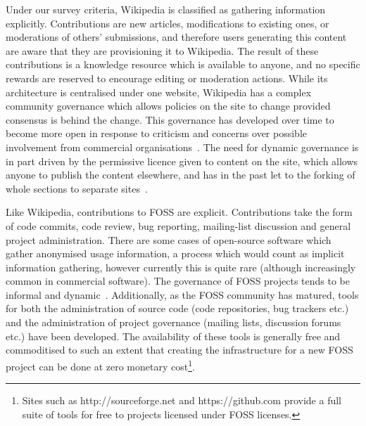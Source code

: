 Under our survey criteria, Wikipedia is classified as gathering information explicitly. Contributions are new articles, modifications to existing ones, or moderations of others' submissions, and therefore users generating this content are aware that they are provisioning it to Wikipedia. The result of these contributions is a knowledge resource which is available to anyone, and no specific rewards are reserved to encourage editing or moderation actions. While its architecture is centralised under one website, Wikipedia has a complex community governance which allows policies on the site to change provided consensus is behind the change. This governance has developed over time to become more open in response to criticism and concerns over possible involvement from commercial organisations~\citep{MayoFusterMorell2011}. The need for dynamic governance is in part driven by the permissive licence given to content on the site, which allows anyone to publish the content elsewhere, and has in the past let to the forking of whole sections to separate sites~\citep{Famiglietti2011}.

Like Wikipedia, contributions to \ac{FOSS} are explicit. Contributions take the form of code commits, code review, bug reporting, mailing-list discussion and general project administration. 
There are some cases of open-source software which gather anonymised usage information, a process which would count as implicit information gathering, however currently this is quite rare (although increasingly common in commercial software). 
The governance of \ac{FOSS} projects tends to be informal and dynamic~\citep{Schweik2007}. 
Additionally, as the \ac{FOSS} community has matured, tools for both the administration of source code (code repositories, bug trackers etc.) and the administration of project governance (mailing lists, discussion forums etc.) have been developed. 
The availability of these tools is generally free and commoditised to such an extent that creating the infrastructure for a new \ac{FOSS} project can be done at zero monetary cost\footnote{Sites such as http://sourceforge.net and https://github.com provide a full suite of tools for free to projects licensed under \ac{FOSS} licenses.}.

